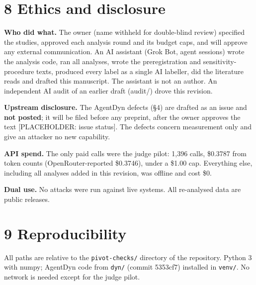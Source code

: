 \documentclass[10pt]{article}
\begin{document}
\section{8 Ethics and disclosure}\label{ethics-and-disclosure}

\textbf{Who did what.} The owner (name withheld for double-blind review) specified the studies, approved each analysis round and its budget caps, and will approve any external communication. An AI assistant (Grok Bot, agent sessions) wrote the analysis code, ran all analyses, wrote the preregistration and sensitivity-procedure texts, produced every label as a single AI labeller, did the literature reads and drafted this manuscript. The assistant is not an author. An independent AI audit of an earlier draft (audit/) drove this revision.

\textbf{Upstream disclosure.} The AgentDyn defects (§4) are drafted as an issue and \textbf{not posted}; it will be filed before any preprint, after the owner approves the text {[}PLACEHOLDER: issue status{]}. The defects concern measurement only and give an attacker no new capability.

\textbf{API spend.} The only paid calls were the judge pilot: 1,396 calls, \$0.3787 from token counts (OpenRouter-reported \$0.3746), under a \$1.00 cap. Everything else, including all analyses added in this revision, was offline and cost \$0.

\textbf{Dual use.} No attacks were run against live systems. All re-analysed data are public releases.

\section{9 Reproducibility}\label{reproducibility}

All paths are relative to the \texttt{pivot-checks/\allowbreak{}} directory of the repository. Python 3 with numpy; AgentDyn code from \texttt{dyn/\allowbreak{}} (commit 5353cf7) installed in \texttt{venv/\allowbreak{}}. No network is needed except for the judge pilot.
\end{document}

